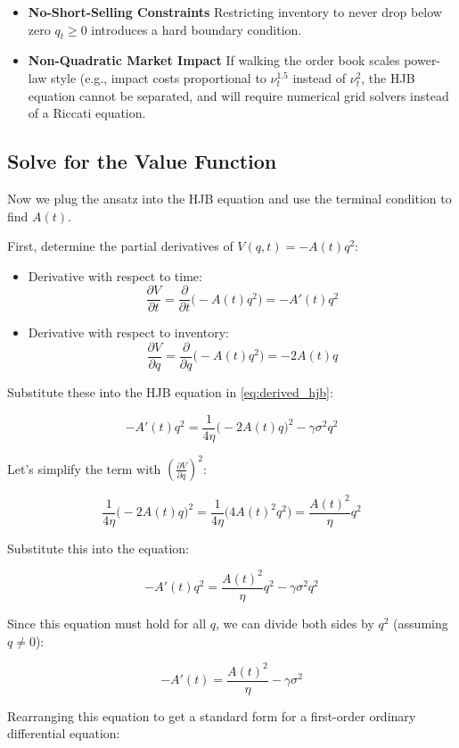 \begin{itemize}
\item \textbf{No-Short-Selling Constraints}
Restricting inventory to never drop below zero $q_t \ge 0$ introduces a hard boundary condition.
\item \textbf{Non-Quadratic Market Impact}
If walking the order book scales power-law style (e.g., impact costs proportional to $\nu _{t}^{1.5}$ instead of $\nu _{t}^{2}$, the HJB equation cannot be separated, and will require numerical grid solvers instead of a Riccati equation.
\end{itemize}

\subsection*{Solve for the Value Function}
Now we plug the ansatz into the HJB equation and use the terminal condition to find $A(t)$.

First, determine the partial derivatives of $V(q, t) = -A(t) q^2$:
\begin{itemize}
\item Derivative with respect to time:
$$\frac{\partial V}{\partial t} = \frac{\partial}{\partial t}\bigg(-A(t) q^2 \bigg) = -A'(t) q^2$$
\item Derivative with respect to inventory:
$$\frac{\partial V}{\partial q} = \frac{\partial}{\partial q}\bigg(-A(t) q^2 \bigg) = -2 A(t) q$$
\end{itemize}

Substitute these into the HJB equation in \eqref{eq:derived_hjb}:

$$-A'(t) q^2 = \frac{1}{4 \eta} \bigg(-2 A(t) q\bigg)^2 - \gamma \sigma^2 q^2$$

Let’s simplify the term with $(\frac{\partial V}{\partial q})^2$:

$$\frac{1}{4 \eta} \bigg(-2 A(t) q \bigg)^2 = \frac{1}{4 \eta} \bigg(4 A(t)^2 q^2 \bigg) = \frac{A(t)^2}{\eta} q^2$$

Substitute this into the equation:

$$-A'(t) q^2 = \frac{A(t)^2}{\eta} q^2 - \gamma \sigma^2 q^2$$

Since this equation must hold for all $q$, we can divide both sides by $q^2$ (assuming $q \neq 0$):

$$-A'(t) = \frac{A(t)^2}{\eta} - \gamma \sigma^2$$

Rearranging this equation to get a standard form for a first-order ordinary differential equation:

